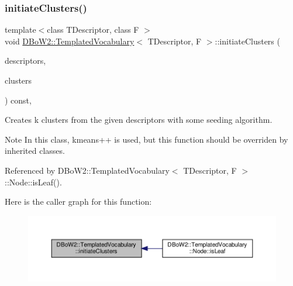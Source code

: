 \subsubsection{\texorpdfstring{initiate\+Clusters()}{initiateClusters()}}
{\footnotesize\ttfamily template$<$class T\+Descriptor, class F $>$ \\
void \hyperlink{classDBoW2_1_1TemplatedVocabulary}{D\+Bo\+W2\+::\+Templated\+Vocabulary}$<$ T\+Descriptor, F $>$\+::initiate\+Clusters (\begin{DoxyParamCaption}\item[{const std\+::vector$<$ \hyperlink{classDBoW2_1_1TemplatedVocabulary_a40913d67e369e6993c2eab80a968f829}{p\+Descriptor} $>$ \&}]{descriptors,  }\item[{std\+::vector$<$ T\+Descriptor $>$ \&}]{clusters }\end{DoxyParamCaption}) const\hspace{0.3cm}{\ttfamily [protected]}, {\ttfamily [virtual]}}

Creates k clusters from the given descriptors with some seeding algorithm. \begin{DoxyNote}{Note}
In this class, kmeans++ is used, but this function should be overriden by inherited classes. 
\end{DoxyNote}


Referenced by D\+Bo\+W2\+::\+Templated\+Vocabulary$<$ T\+Descriptor, F $>$\+::\+Node\+::is\+Leaf().

Here is the caller graph for this function\+:\nopagebreak
\begin{figure}[H]
\begin{center}
\leavevmode
\includegraphics[width=350pt]{classDBoW2_1_1TemplatedVocabulary_a052c169ea13af2e7de1baa5597f60fb7_icgraph}
\end{center}
\end{figure}
\mbox{\label{classDBoW2_1_1TemplatedVocabulary_ab22e6bcfb6a1e8330a90edd732617875}} 
